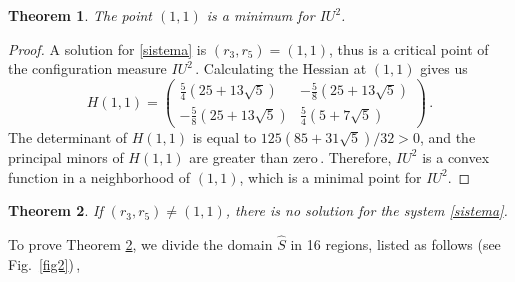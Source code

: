 \documentclass[final,11pt]{article}
\numberwithin{equation}{section}
\newtheorem{theorem}{Theorem}[section]
\theoremstyle{definition}
\begin{document}
\begin{theorem}\label{th:existence}
The point $(1,1)$ is a minimum for $IU^{2}$.
\end{theorem}

\begin{proof}
A solution for \eqref{sistema} is $(r_3,r_5)=(1,1)$, thus is a critical point of the configuration measure $IU^{2}$\,. Calculating the Hessian at $(1,1)$ gives us 
\[ H(1,1) =
\left( \begin{array}{cc}
\frac{5}{4}(25 + 13 \sqrt{5}) & -\frac{5}{8}(25 + 13 \sqrt{5})\\[2mm]
-\frac{5}{8}(25 + 13 \sqrt{5}) & \frac{5}{4}(5 + 7 \sqrt{5})
\end{array} \right)\,. \]
The determinant of $H(1,1)$ is equal to $125(85 + 31 \sqrt{5})/32>0$, and the principal minors of $H(1,1)$ are greater than zero\,. Therefore, $IU^2$ is a convex function in a neighborhood of $(1,1)$, which is a minimal point for $IU^2$.
\end{proof}

\begin{theorem}\label{teorema}
If $(r_{3},r_{5})\neq(1,1)$, there is no solution for the system \eqref{sistema}.
\end{theorem}
To prove Theorem \ref{teorema}, we divide the domain $\hat{S}$ in 16 regions, listed as follows (see Fig.~\ref{fig2})\,,
\end{document}
